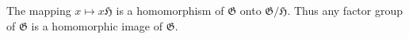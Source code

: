 The mapping $x \mapsto x\mathfrak{H}$ is a homomorphism of $\mathfrak{G}$ onto $\mathfrak{G}/\mathfrak{H}$. Thus any factor group of $\mathfrak{G}$ is a homomorphic image of $\mathfrak{G}$.
